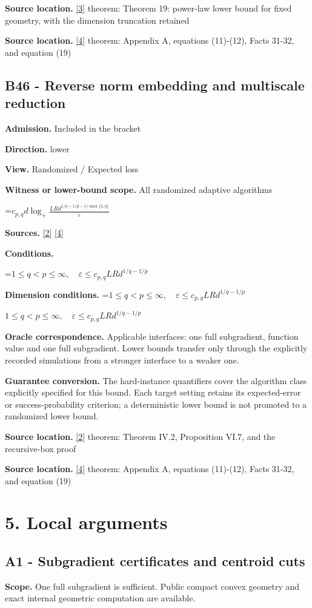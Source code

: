 \documentclass[10pt,a4paper]{article}
\newcommand{\AtlasMath}[1]{\par\begingroup\centering\setbox0=\hbox{$\displaystyle #1$}\ifdim\wd0>1.4\linewidth\typeout{ATLAS WIDE FORMULA: \the\wd0}\fi\ifdim\wd0>\linewidth\resizebox{\linewidth}{!}{\box0}\else\box0\fi\par\endgroup}
\newcommand{\AtlasInlineMath}[1]{\begingroup\setbox0=\hbox{$#1$}\ifdim\wd0>.4\linewidth\endgroup\AtlasMath{#1}\else\endgroup$#1$\fi}
\begin{document}
\textbf{Source location.} \href{https://arxiv.org/pdf/2609.20701}{[3]} theorem: Theorem 19: power-law lower bound for fixed geometry, with the dimension truncation retained

\textbf{Source location.} \href{https://arxiv.org/pdf/2609.20687}{[4]} theorem: Appendix A, equations (11)-(12), Facts 31-32, and equation (19)

\subsection{B46 - Reverse norm embedding and multiscale reduction}
\textbf{Admission.} Included in the bracket

\textbf{Direction.} lower

\textbf{View.} Randomized / Expected loss

\textbf{Witness or lower-bound scope.} All randomized adaptive algorithms

\AtlasMath{c_{p,q}d\log_+\frac{LRd^{1/q-1/p-1/\max\{2,q\}}}{\varepsilon}}
\textbf{Sources.} \href{https://arxiv.org/pdf/1407.5144}{[2]} \href{https://arxiv.org/pdf/2609.20687}{[4]}

\textbf{Conditions.} 
\AtlasMath{1\le q<p\le\infty,\quad\varepsilon\le c_{p,q}LRd^{1/q-1/p}}


\textbf{Dimension conditions.} \AtlasInlineMath{1\le q<p\le\infty,\quad\varepsilon\le c_{p,q}LRd^{1/q-1/p}}

\textbf{Oracle correspondence.} Applicable interfaces: one full subgradient, function value and one full subgradient. Lower bounds transfer only through the explicitly recorded simulations from a stronger interface to a weaker one.

\textbf{Guarantee conversion.} The hard-instance quantifiers cover the algorithm class explicitly specified for this bound. Each target setting retains its expected-error or success-probability criterion; a deterministic lower bound is not promoted to a randomized lower bound.

\textbf{Source location.} \href{https://arxiv.org/pdf/1407.5144}{[2]} theorem: Theorem IV.2, Proposition VI.7, and the recursive-box proof

\textbf{Source location.} \href{https://arxiv.org/pdf/2609.20687}{[4]} theorem: Appendix A, equations (11)-(12), Facts 31-32, and equation (19)

\section{5. Local arguments}
\subsection{A1 - Subgradient certificates and centroid cuts}
\textbf{Scope.} One full subgradient is sufficient. Public compact convex geometry and exact internal geometric computation are available.
\end{document}
